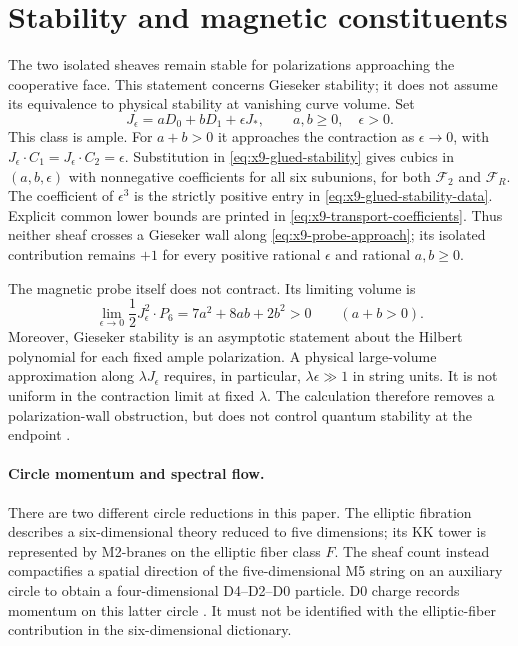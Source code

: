 \section{Stability and magnetic constituents}
\label{subsec:x9-probe-transport}

The two isolated sheaves remain stable for polarizations approaching
the cooperative face. This statement concerns Gieseker stability;
it does not assume its equivalence to physical stability at vanishing
curve volume. Set
\begin{equation}
 J_\epsilon=aD_0+bD_1+\epsilon J_*,\qquad
 a,b\geq0,\quad \epsilon>0.
 \label{eq:x9-probe-approach}
\end{equation}
This class is ample. For $a+b>0$ it approaches the contraction as
$\epsilon\to0$, with
$J_\epsilon\cdot C_1=J_\epsilon\cdot C_2=\epsilon$.
Substitution in \eqref{eq:x9-glued-stability} gives cubics in
$(a,b,\epsilon)$ with nonnegative coefficients for all six subunions,
for both $\mathcal F_2$ and $\mathcal F_R$. The coefficient of
$\epsilon^3$ is the strictly positive entry in
\eqref{eq:x9-glued-stability-data}. Explicit common lower bounds
are printed in \eqref{eq:x9-transport-coefficients}.
Thus neither sheaf crosses a Gieseker wall along
\eqref{eq:x9-probe-approach}; its isolated contribution remains $+1$
for every positive rational $\epsilon$ and rational $a,b\geq0$.

The magnetic probe itself does not contract. Its limiting volume is
\begin{equation}
 \lim_{\epsilon\to0}\frac12J_\epsilon^2\cdot P_6
 =7a^2+8ab+2b^2>0\qquad(a+b>0).
 \label{eq:x9-probe-volume}
\end{equation}
Moreover, Gieseker stability is an asymptotic statement about the
Hilbert polynomial for each fixed ample polarization. A physical
large-volume approximation along $\lambda J_\epsilon$ requires, in
particular, $\lambda\epsilon\gg1$ in string units. It is not uniform
in the contraction limit at fixed $\lambda$. The calculation therefore
removes a polarization-wall obstruction, but does not control quantum
stability at the endpoint \cite[Appendix~B.2]{Alim:2010M5}.

\paragraph{Circle momentum and spectral flow.}
There are two different circle reductions in this paper. The elliptic
fibration describes a six-dimensional theory reduced to five dimensions;
its KK tower is represented by M2-branes on the elliptic fiber class
$F$. The sheaf count instead compactifies a spatial direction of the
five-dimensional M5 string on an auxiliary circle to obtain a
four-dimensional D4--D2--D0 particle. D0 charge records momentum on
this latter circle \cite[Section~2.1]{Alim:2010M5}. It must not be
identified with the elliptic-fiber contribution in the six-dimensional dictionary.

